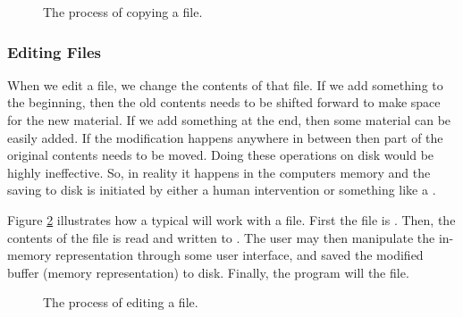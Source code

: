 \begin{figure}[tbp]
  
  \caption{The process of copying a file.}
  \label{fig:bg:processes:copy}
\end{figure}

\subsubsection{Editing Files}

When we edit a file, we change the contents of that file. If we add something to the beginning, then the old contents needs to be shifted forward to make space for the new material. If we add something at the end, then some material can be easily added. If the modification happens anywhere in between then part of the original contents needs to be moved. Doing these operations on disk would be highly ineffective. So, in reality it happens in the computers memory and the saving to disk is initiated by either a human intervention or something like a .

Figure \ref{fig:bg:processes:edit} illustrates how a typical  will work with a file. First the file is . Then, the contents of the file is read and written to . The user may then manipulate the in-memory representation through some user interface, and saved the modified buffer (memory representation) to disk. Finally, the program will  the file.

\begin{figure}[tbp]
  
  \caption{The process of editing a file.}
  \label{fig:bg:processes:edit}
\end{figure}


